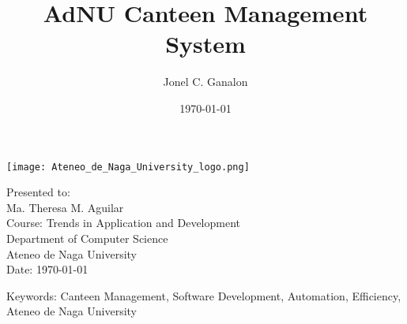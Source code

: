 \usepackage{graphicx}

\title{AdNU Canteen Management System}
\author{Jonel C. Ganalon}
\date{\today}

\maketitle

\thispagestyle{empty}

\begin{center}
    \vspace{2cm} 
    \texttt{[image: Ateneo\_de\_Naga\_University\_logo.png]}

    \vspace{2cm} 
    Presented to: \\
    Ma. Theresa M. Aguilar \\
    Course: Trends in Application and Development \\
    Department of Computer Science \\
    Ateneo de Naga University \\
    \vspace{1cm}
    Date: \today
    
    \vspace{0.5cm}
    Keywords: Canteen Management, Software Development, Automation, Efficiency, Ateneo de Naga University
\end{center}



